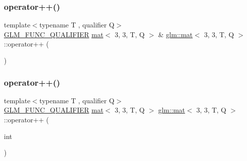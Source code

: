 \mbox{\label{structglm_1_1mat_3_013_00_013_00_01_t_00_01_q_01_4_ab04f2425cf74fb2edd7fdef18e9c2201}} 
\subsubsection{\texorpdfstring{operator++()}{operator++()}\hspace{0.1cm}{\footnotesize\ttfamily [1/2]}}
{\footnotesize\ttfamily template$<$typename T , qualifier Q$>$ \\
\hyperlink{setup_8hpp_a33fdea6f91c5f834105f7415e2a64407}{G\+L\+M\+\_\+\+F\+U\+N\+C\+\_\+\+Q\+U\+A\+L\+I\+F\+I\+ER} \hyperlink{structglm_1_1mat}{mat}$<$ 3, 3, T, Q $>$ \& \hyperlink{structglm_1_1mat}{glm\+::mat}$<$ 3, 3, T, Q $>$\+::operator++ (\begin{DoxyParamCaption}{ }\end{DoxyParamCaption})}

\mbox{\label{structglm_1_1mat_3_013_00_013_00_01_t_00_01_q_01_4_a1c09b6fe99f20acf55ee20c1820ff0cd}} 
\subsubsection{\texorpdfstring{operator++()}{operator++()}\hspace{0.1cm}{\footnotesize\ttfamily [2/2]}}
{\footnotesize\ttfamily template$<$typename T , qualifier Q$>$ \\
\hyperlink{setup_8hpp_a33fdea6f91c5f834105f7415e2a64407}{G\+L\+M\+\_\+\+F\+U\+N\+C\+\_\+\+Q\+U\+A\+L\+I\+F\+I\+ER} \hyperlink{structglm_1_1mat}{mat}$<$ 3, 3, T, Q $>$ \hyperlink{structglm_1_1mat}{glm\+::mat}$<$ 3, 3, T, Q $>$\+::operator++ (\begin{DoxyParamCaption}\item[{int}]{ }\end{DoxyParamCaption})}

\mbox{\label{structglm_1_1mat_3_013_00_013_00_01_t_00_01_q_01_4_abf9da018243788a6fe452e4bdf18526d}} 
